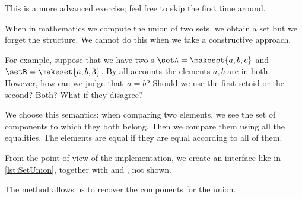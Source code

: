 \begin{remark}
    This is a more advanced exercise; feel free to skip the first time around.
\end{remark}

When in mathematics we compute the union of two sets, we obtain a set but we forget the structure.
We cannot do this when we take a constructive approach.

For example, suppose that we have two \Setoid{}s $\setA = \makeset{a,b,c}$ and~$\setB = \makeset{a,b,3}$.
By all accounts the elements $a,b$ are in both.
However, how can we judge that~$a=b$?
Should we use the first setoid or the second?
Both?
What if they disagree?

We choose this semantics: when comparing two elements, we see the set of components to which they both belong.
Then we compare them using all the equalities.
The elements are equal if they are equal according to all of them.


From the point of view of the implementation, we create an interface like in \cref{lst:SetUnion}, together with \EnumerableSetUnion and \FiniteSetUnion, not shown.


The method  allows us to recover the components for the union.


\begin{widepar}
\end{widepar}

 

